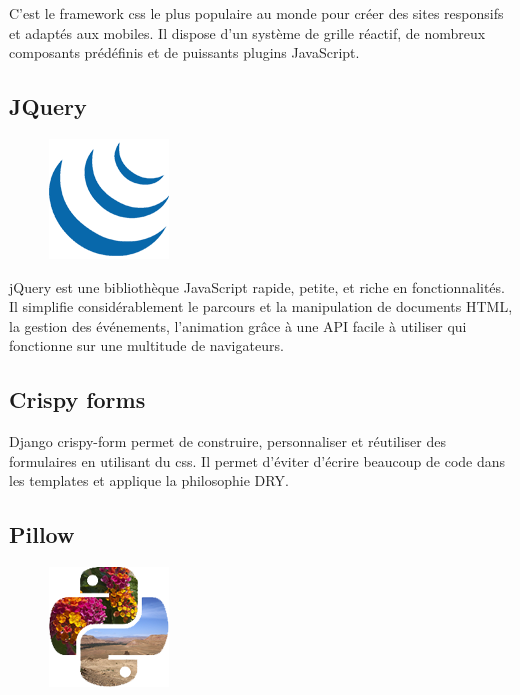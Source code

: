 C’est le framework css le plus populaire au monde pour créer des sites 
responsifs et adaptés aux mobiles. Il dispose d’un système de grille réactif, 
de nombreux composants prédéfinis et de puissants plugins JavaScript\cite{22}.

\subsection{JQuery}
\begin{figure}
    \vspace{-22pt}
    \begin{center}
        \includegraphics[scale=0.36]{images/logo/jquery.png}
        \label{fig79}
    \end{center}
    \vspace{-20pt}
    \vspace{-10pt}
\end{figure}

jQuery est une bibliothèque JavaScript rapide, petite, et riche en
fonctionnalités. Il simplifie considérablement le parcours et la manipulation de
documents HTML, la gestion des événements, l'animation grâce à une API facile à
utiliser qui fonctionne sur une multitude de navigateurs\cite{23}.

\subsection{Crispy forms}
Django crispy-form permet de construire, personnaliser et réutiliser des
formulaires en utilisant du css. Il permet d'éviter d'écrire beaucoup de code
dans les templates et applique la philosophie DRY\cite{24}.

\subsection{Pillow}
\begin{figure}
    \vspace{-22pt}
    \begin{center}
        \includegraphics[scale=0.36]{images/logo/pillow.png}
        \label{fig80}
    \end{center}
    \vspace{-20pt}
    \vspace{-10pt}
\end{figure}

